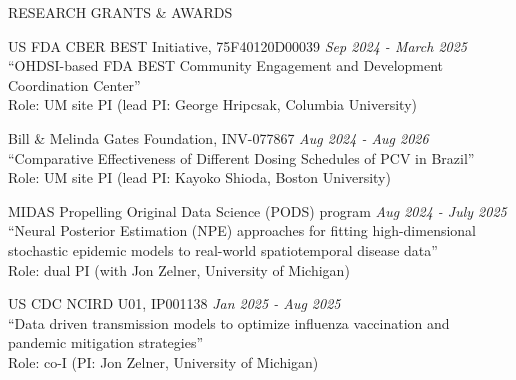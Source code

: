 \documentclass{resume} %
\begin{document}
\begin{rSection}{RESEARCH GRANTS \& AWARDS}
	

	\hspace*{-0.25in} 
	US FDA CBER BEST Initiative,  75F40120D00039    \hfill{\em Sep 2024 - March 2025}
 \\
	``OHDSI-based FDA BEST Community Engagement and Development Coordination Center'' \\
	Role: UM site PI (lead PI: George Hripcsak, Columbia University)
	\medskip 
	
	\hspace*{-0.25in} 
		Bill \& Melinda Gates Foundation, INV-077867     \hfill{\em Aug 2024 - Aug 2026}
			 \\
	``Comparative Effectiveness of Different Dosing Schedules of PCV in Brazil'' \\
	Role: UM site PI (lead PI: Kayoko Shioda, Boston University)
	
		\medskip 
	
	\hspace*{-0.25in} 
	MIDAS Propelling Original Data Science (PODS) program \hfill{\em Aug 2024 - July 2025} 
	\\
	``Neural Posterior Estimation (NPE) approaches for fitting high-dimensional stochastic epidemic models to real-world spatiotemporal disease data'' \\
	Role: dual PI (with Jon Zelner, University of Michigan)
	
	\medskip 
	
	\hspace*{-0.25in}
	US CDC NCIRD U01, IP001138 \hfill{\em Jan 2025 - Aug 2025} 
	\\
	``Data driven transmission models to optimize influenza vaccination and pandemic mitigation strategies'' \\
	Role: co-I (PI: Jon Zelner, University of Michigan)
	
\end{rSection}


\end{document}
